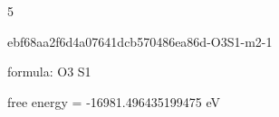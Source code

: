 \documentclass{article}
\begin{document}
5

\vspace{1cm}


ebf68aa2f6d4a07641dcb570486ea86d-O3S1-m2-1



formula: O3 S1



free energy = -16981.496435199475 eV
\end{document}
